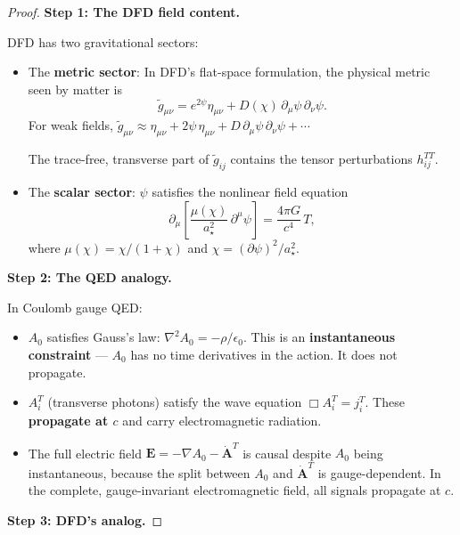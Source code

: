 \documentclass[11pt,a4paper]{article}
\begin{document}
\begin{proof}
\textbf{Step 1: The DFD field content.}

DFD has two gravitational sectors:
\begin{itemize}
\item The \textbf{metric sector}: In DFD's flat-space formulation, the physical metric seen by matter is
\begin{equation}
\tilde{g}_{\mu\nu} = e^{2\psi}\eta_{\mu\nu} + D(\chi)\,\partial_\mu\psi\,\partial_\nu\psi.
\end{equation}
For weak fields, $\tilde{g}_{\mu\nu} \approx \eta_{\mu\nu} + 2\psi\,\eta_{\mu\nu} + D\,\partial_\mu\psi\,\partial_\nu\psi + \cdots$

The trace-free, transverse part of $\tilde{g}_{ij}$ contains the tensor perturbations $h_{ij}^{TT}$.

\item The \textbf{scalar sector}: $\psi$ satisfies the nonlinear field equation
\begin{equation}\label{eq:psi-field-eq}
\partial_\mu\left[\frac{\mu(\chi)}{a_\star^2}\,\partial^\mu\psi\right] = \frac{4\pi G}{c^4}\,T,
\end{equation}
where $\mu(\chi) = \chi/(1+\chi)$ and $\chi = (\partial\psi)^2/a_\star^2$.
\end{itemize}

\textbf{Step 2: The QED analogy.}

In Coulomb gauge QED:
\begin{itemize}
\item $A_0$ satisfies Gauss's law: $\nabla^2 A_0 = -\rho/\epsilon_0$. This is an \textbf{instantaneous constraint} --- $A_0$ has no time derivatives in the action. It does not propagate.
\item $A_i^T$ (transverse photons) satisfy the wave equation $\Box A_i^T = j_i^T$. These \textbf{propagate at $c$} and carry electromagnetic radiation.
\item The full electric field $\mathbf{E} = -\nabla A_0 - \dot{\mathbf{A}}^T$ is causal despite $A_0$ being instantaneous, because the split between $A_0$ and $\dot{\mathbf{A}}^T$ is gauge-dependent. In the complete, gauge-invariant electromagnetic field, all signals propagate at $c$.
\end{itemize}

\textbf{Step 3: DFD's analog.}


\end{proof}
\end{document}
